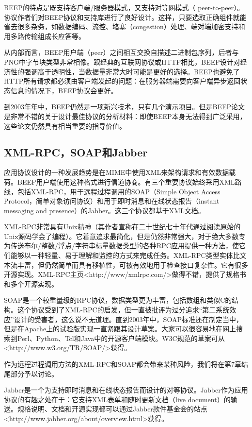\documentclass[12pt,oneside]{book}
\begin{document}
\begin{common-format}
BEEP的特点是既支持客户端/服务器模式，又支持对等网模式（ peer-to-peer）。协议作者们对BEEP协议和支持库进行了良好设计。这样，只要选取正确组件就能省去很多杂务，如数据编码、流控、堵塞（congestion）处理、端对端加密支持和用多路传输组成长应答等。

从内部而言，BEEP用户端（peer）之间相互交换自描述二进制包序列，后者与PNG中字节块类型非常相像。跟经典的互联网协议或HTTP相比，BEEP设计对经济性的强调高于透明性，当数据量非常大时可能是更好的选择。BEEP也避免了HTTP所有请求都必须由客户端发起的问题：在服务器端需要向客户端异步返回状态信息的情况下，BEEP协议会更好。

到2003年年中，BEEP仍然是一项新兴技术，只有几个演示项目。但是BEEP论文是非常不错的关于设计最佳协议的分析材料：即使BEEP本身无法得到广泛采用，这些论文仍然具有相当重要的指导价值。

\subsection{XML-RPC，SOAP和Jabber}
应用协议设计的一种发展趋势是在MIME中使用XML来架构请求和有效数据载荷。BEEP用户端使用这种格式进行信道协商。有三个重要协议始终采用XML路线，包括XML-RPC，用于远程过程调用的SOAP（Simple Object Access Protocol，简单对象访问协议）和用于即时消息和在线状态报告（instant messaging and presence）的Jabber。这三个协议都基于XML文档。

XML-RPC非常具有Unix精神（其作者宣称在二十世纪七十年代通过阅读原始的Unix源码学会了编程）。它着意追求最简化，但是仍然非常强大，对于绝大多数专为传送布尔/整数/浮点/字符串标量数据类型的各种RPC应用提供一种方法，使它们能够以一种轻量、易于理解和监控的方式来完成任务。XML-RPC类型实体比文本流丰富，但仍然简单而具有移植性，可被有效地用于检查接口复杂性。它有很多开源实现。XML-RPC主页<http://www/xmlrpc.com/>做得不错，提供了规格书和多个开源实现。

SOAP是一个较重量级的RPC协议，数据类型更为丰富，包括数组和类似C的结构。这个协议受到了XML-RPC的启发，但一直被批评为过分追求“第二系统效应”设计的受害者，这么说不无道理。直到2003年中，SOAP标准还在制定当中，但是在Apache上的试验版实现一直紧跟其设计草案。大家可以很容易地在网上搜索到Perl、Python、Tcl和Java中的开源客户端模块。W3C规范的草案可从<http://www.w3.org/TR/SOAP/>获得。

作为远程过程调用方法的XML-RPC和SOAP都会带来某种风险，我们将在第7章结尾部分予以讨论。

Jabber是一个为支持即时消息和在线状态报告而设计的对等协议。Jabber作为应用协议的有趣之处在于：它支持XML表单和随时更新文档（live document）的输送。规格说明、文档和开源实现都可以通过Jabber款件基金会的站点<http://www.jabber.org/about/overview.html>获得。



\end{common-format}
\end{document}
